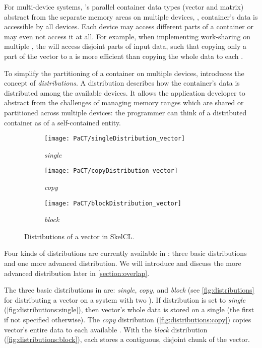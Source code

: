 For multi-device systems, \SkelCL's parallel container data types (vector and matrix) abstract from the separate memory areas on multiple \OpenCL devices, \ie, container's data is accessible by all devices.
Each device may access different parts of a container or may even not access it at all.
For example, when implementing work-sharing on multiple \GPUs, the \GPUs will access disjoint parts of input data, such that copying only a part of the vector to a \GPU is more efficient than copying the whole data to each \GPU.

To simplify the partitioning of a container on multiple devices, \SkelCL introduces the concept of \emph{distributions}.
A distribution describes how the container's data is distributed among the available devices.
It allows the application developer to abstract from the challenges of managing memory ranges which are shared or partitioned across multiple devices: the programmer can think of a distributed container as of a self-contained entity.



\begin{figure}[tb]
  \centering
  \begin{subfigure}{.3\textwidth}
    \texttt{[image: PaCT/singleDistribution\_vector]}
    \caption{\emph{single}}
    \label{fig:distributions:single}
  \end{subfigure}
  \hfill
  \begin{subfigure}{.3\textwidth}
    \texttt{[image: PaCT/copyDistribution\_vector]}
    \caption{\emph{copy}}
    \label{fig:distributions:copy}
  \end{subfigure}
  \hfill
  \begin{subfigure}{.3\textwidth}
    \texttt{[image: PaCT/blockDistribution\_vector]}
    \caption{\emph{block}}
    \label{fig:distributions:block}
  \end{subfigure}
  \caption{Distributions of a vector in SkelCL.}
  \label{fig:distributions}
  \bigskip
\end{figure}


Four kinds of distributions are currently available in \SkelCL:
three basic distributions and one more advanced distribution.
We will introduce and discuss the more advanced distribution later in \autoref{section:overlap}.

The three basic distributions in \SkelCL are:
\emph{single}, \emph{copy}, and \emph{block} (see \autoref{fig:distributions} for distributing a vector on a system with two \GPUs).
If distribution is set to \emph{single} (\autoref{fig:distributions:single}), then vector's whole data is stored on a single \GPU (the first \GPU if not specified otherwise).
The \emph{copy} distribution (\autoref{fig:distributions:copy}) copies vector's entire data to each available \GPU.
With the \emph{block} distribution (\autoref{fig:distributions:block}), each \GPU stores a contiguous, disjoint chunk of the vector.

